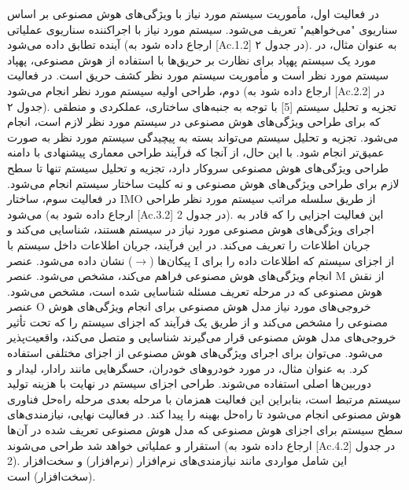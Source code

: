 \documentclass[a4paper,10pt]{article}
\begin{document}
                    در فعالیت اول، مأموریت سیستم مورد نیاز با ویژگی‌های هوش مصنوعی بر اساس سناریوی "می‌خواهیم" تعریف می‌شود. سیستم مورد نیاز با اجراکننده سناریوی عملیاتی آینده تطابق داده می‌شود (ارجاع داده شود به [Ac.1.2] در جدول ۲). به عنوان مثال، در مورد یک سیستم پهپاد برای نظارت بر حریق‌ها با استفاده از هوش مصنوعی، پهپاد سیستم مورد نظر است و مأموریت سیستم مورد نظر کشف حریق است. در فعالیت دوم، طراحی اولیه سیستم مورد نظر انجام می‌شود (ارجاع داده شود به [Ac.2.2] در جدول ۲). تجزیه و تحلیل سیستم [5] با توجه به جنبه‌های ساختاری، عملکردی و منطقی که برای طراحی ویژگی‌های هوش مصنوعی در سیستم مورد نظر لازم است، انجام می‌شود. تجزیه و تحلیل سیستم می‌تواند بسته به پیچیدگی سیستم مورد نظر به صورت عمیق‌تر انجام شود. با این حال، از آنجا که فرآیند طراحی معماری پیشنهادی با دامنه طراحی ویژگی‌های هوش مصنوعی سروکار دارد، تجزیه و تحلیل سیستم تنها تا سطح لازم برای طراحی ویژگی‌های هوش مصنوعی و نه کلیت ساختار سیستم انجام می‌شود. در فعالیت سوم، ساختار IMO از طریق سلسله مراتب سیستم مورد نظر طراحی می‌شود (ارجاع داده شود به [Ac.3.2] در جدول 2). این فعالیت اجزایی را که قادر به اجرای ویژگی‌های هوش مصنوعی مورد نیاز در سیستم هستند، شناسایی می‌کند و جریان اطلاعات را تعریف می‌کند. در این فرآیند، جریان اطلاعات داخل سیستم با پیکان‌ها ($\rightarrow$) نشان داده می‌شود. عنصر I از اجزای سیستم که اطلاعات داده را برای انجام ویژگی‌های هوش مصنوعی فراهم می‌کند، مشخص می‌شود. عنصر M از نقش هوش مصنوعی که در مرحله تعریف مسئله شناسایی شده است، مشخص می‌شود. عنصر O خروجی‌های مورد نیاز مدل هوش مصنوعی برای انجام ویژگی‌های هوش مصنوعی را مشخص می‌کند و از طریق یک فرآیند که اجزای سیستم را که تحت تأثیر خروجی‌های مدل هوش مصنوعی قرار می‌گیرند شناسایی و متصل می‌کند، واقعیت‌پذیر می‌شود. می‌توان برای اجرای ویژگی‌های هوش مصنوعی از اجزای مختلفی استفاده کرد. به عنوان مثال، در مورد خودروهای خودران، حسگرهایی مانند رادار، لیدار و دوربین‌ها اصلی استفاده می‌شوند. طراحی اجزای سیستم در نهایت با هزینه تولید سیستم مرتبط است، بنابراین این فعالیت همزمان با مرحله بعدی مرحله راه‌حل فناوری هوش مصنوعی انجام می‌شود تا راه‌حل بهینه را پیدا کند. در فعالیت نهایی، نیازمندی‌های سطح سیستم برای اجزای هوش مصنوعی که مدل هوش مصنوعی تعریف شده در آن‌ها استقرار و عملیاتی خواهد شد طراحی می‌شوند (ارجاع داده شود به [Ac.4.2] در جدول 2). این شامل مواردی مانند نیازمندی‌های نرم‌افزار (نرم‌افزار) و سخت‌افزار (سخت‌افزار) است.
\end{document}
